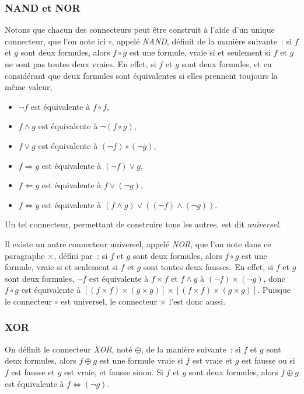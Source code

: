\subsubsection{NAND et NOR}

Notons que chacun des connecteurs peut être construit à l'aide d'un unique connecteur, que l'on note ici $\circ$, appelé \textit{NAND}, définit de la manière suivante : si $f$ et $g$ sont deux formules, alors $f \circ g$ est une formule, vraie si et seulement si $f$ et $g$ ne sont pas toutes deux vraies. 
En effet, si $f$ et $g$ sont deux formules, et en considérant que deux formules sont équivalentes si elles prennent toujours la même valeur,
\begin{itemize}
    \item $\neg f$ est équivalente à $f \circ f$,
    \item $f \wedge g$ est équivalente à $\neg (f \circ g)$,
    \item $f \vee g$ est équivalente à $(\neg f) \circ (\neg g)$,
    \item $f \Rightarrow g$ est équivalente à $(\neg f) \vee g$,
    \item $f \Leftarrow g$ est équivalente à $f \vee (\neg g)$,
    \item $f \Leftrightarrow g$ est équivalente à $(f \wedge g) \vee ((\neg f) \wedge (\neg g))$.
\end{itemize}
Un tel connecteur, permettant de construire tous les autres, est dit \textit{universel}.

Il existe un autre connecteur universel, appelé \textit{NOR}, que l'on note dans ce paragraphe $\times$, défini par : si $f$ et $g$ sont deux formules, alors $f \circ g$ est une formule, vraie si et seulement si $f$ et $g$ sont toutes deux fausses. 
En effet, si $f$ et $g$ sont deux formules, $\neg f$ est équivalente à $f \times f$ et $f \wedge g$ à $(\neg f) \times (\neg g)$, donc $f \circ g$ est équivalente à $[(f \times f) \times (g \times g)] \times [(f \times f) \times (g \times g)]$. 
Puisque le connecteur $\circ$ est universel, le connecteur $\times$ l'est donc aussi.

\subsubsection{XOR} 
\label{subsub:XOR}

 \sindex[isy]{$\oplus$}
On définit le connecteur \textit{XOR}, noté $\oplus$, de la manière suivante : si $f$ et $g$ sont deux formules, alors $f \oplus g$ est une formule vraie si $f$ est vraie et $g$ est fausse ou si $f$ est fausse et $g$ est vraie, et fausse sinon. 
Si $f$ et $g$ sont deux formules, alors $f \oplus g$ est équivalente à $f \Leftrightarrow (\neg g)$. 

